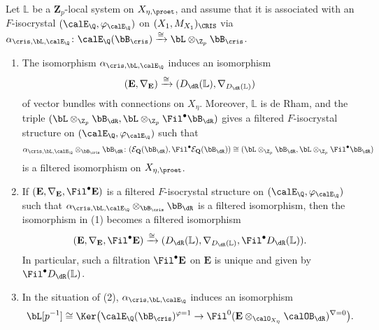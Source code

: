 \begin{prop} \label{prop:association-filtration-compatibility}
Let $\mathbb{L}$ be a $\mathbf{Z}_p$-local system on $X_{\eta,\proet}$, and assume that it is associated with an $F$-isocrystal $(\calE_\Q,\varphi_{\calE_\Q})$ on $(X_1,M_{X_1})_{\CRIS}$ via  $\alpha_{\cris,\bL,\calE_\Q}\colon \calE_\Q(\bB_{\cris})\xrightarrow{\cong}\bL\otimes_{\Z_p}\bB_\cris$. 
\begin{enumerate}
    \item The isomorphism $\alpha_{\cris,\bL,\calE_\Q}$ induces an isomorphism
\[
(\mathbf{E},\nabla_{\mathbf{E}})\xrightarrow{\cong}(D_\dR(\mathbb{L}),\nabla_{D_\dR(\mathbb{L})})
\]
of vector bundles with connections on $X_\eta$.
Moreover, $\mathbb{L}$ is de Rham, and the triple $(\bL\otimes_{\Z_p}\bB_{\dR}, \bL\otimes_{\Z_p}\Fil^\bullet\bB_{\dR})$ gives a filtered $F$-isocrystal structure on $(\calE_\Q,\varphi_{\calE_\Q})$ such that 
    \[
\alpha_{\cris,\bL,\calE_\Q}\otimes_{\bB_{\cris}} \bB_{\dR}\colon (\mathcal{E}_{\mathbf{Q}}(\bB_{\dR}),\Fil^\bullet \mathcal{E}_{\mathbf{Q}}(\bB_{\dR})) \cong  (\bL\otimes_{\Z_p}\bB_{\dR}, \bL\otimes_{\Z_p}\Fil^\bullet\bB_{\dR})
\]
is a filtered isomorphism on $X_{\eta,\proet}$. 
    \item If $(\mathbf{E},\nabla_{\mathbf{E}},\Fil^\bullet\mathbf{E})$ is a filtered $F$-isocrystal structure on $(\calE_\Q,\varphi_{\calE_\Q})$ such that $\alpha_{\cris,\bL,\calE_\Q}\otimes_{\bB_{\cris}} \bB_{\dR}$ is a filtered isomorphism, 
then the isomorphism in (1) becomes a filtered isomorphism
\[
(\mathbf{E},\nabla_{\mathbf{E}},\Fil^\bullet\mathbf{E})\xrightarrow{\cong}(D_\dR(\mathbb{L}),\nabla_{D_\dR(\mathbb{L})},\Fil^\bullet D_\dR(\mathbb{L})).
\]
In particular, such a filtration $\Fil^\bullet\mathbf{E}$ on $\mathbf{E}$ is unique and given by $\Fil^\bullet D_\dR(\mathbb{L})$.
\item In the situation of (2), $\alpha_{\cris,\bL,\calE_\Q}$ induces an isomorphism
\[
\bL[p^{-1}]\cong \Ker\bigl(\calE_\Q(\bB_{\cris})^{\varphi=1}\rightarrow \Fil^0(\mathbf{E}\otimes_{\calO_{X_\eta}}\calOB_\dR)^{\nabla=0}\bigl).
\]
\end{enumerate}
\end{prop}


